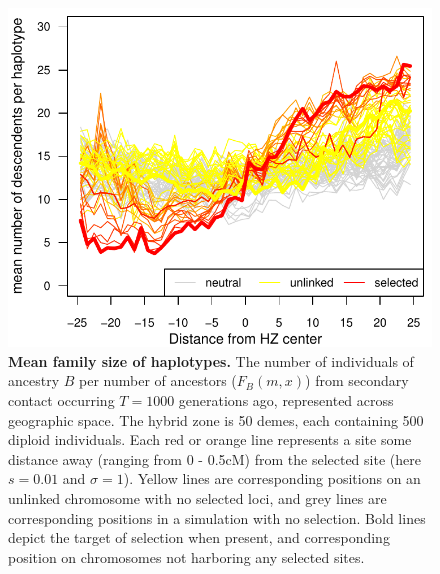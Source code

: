 \documentclass[11pt,letterpaper]{article}
\newcommand{\alisa}[1]{{\em \color{red} #1}}
\begin{document}


\begin{figure}
\includegraphics{figs/number_of_ancestors_tau1000.pdf}
\caption{\textbf{Mean family size of haplotypes.} The number of individuals of ancestry $B$ per number of ancestors ($F_B(m,x)$) from secondary contact occurring $T=1000$ generations ago, represented across geographic space. The hybrid zone is 50 demes, each containing 500 diploid individuals.
 Each red or orange line represents a site some distance away (ranging from 0 - 0.5cM) from the selected site (here $s=0.01$ and $\sigma=1$). Yellow lines are corresponding positions on an unlinked chromosome with no selected loci, and grey lines are corresponding positions in a simulation with no selection.  Bold lines depict the target of selection when present, and corresponding position on chromosomes not harboring any selected sites.}\label{Fig:family_size}
\end{figure}
\end{document}
